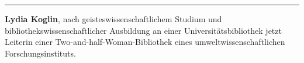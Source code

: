 \begin{center}\rule{0.5\linewidth}{\linethickness}\end{center}

\textbf{Lydia Koglin}, nach geisteswissenschaftlichem Studium und
bibliothekswissenschaftlicher Ausbildung an einer Universitätsbibliothek
jetzt Leiterin einer Two-and-half-Woman-Bibliothek eines
umweltwissenschaftlichen Forschungsinstituts.
